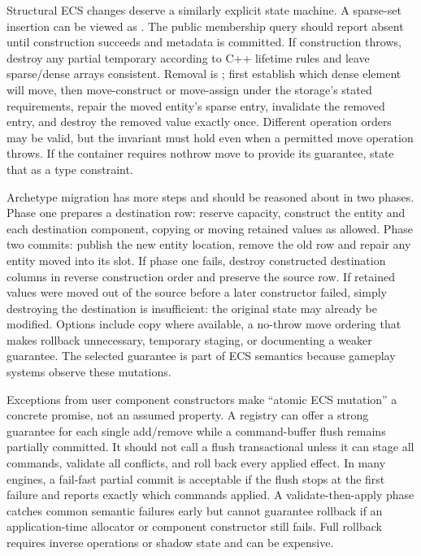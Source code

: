 Structural ECS changes deserve a similarly explicit state machine. A sparse-set insertion can be viewed as . The public membership query should report absent until construction succeeds and metadata is committed. If construction throws, destroy any partial temporary according to C++ lifetime rules and leave sparse/dense arrays consistent. Removal is ; first establish which dense element will move, then move-construct or move-assign under the storage's stated requirements, repair the moved entity's sparse entry, invalidate the removed entry, and destroy the removed value exactly once. Different operation orders may be valid, but the invariant must hold even when a permitted move operation throws. If the container requires nothrow move to provide its guarantee, state that as a type constraint.

Archetype migration has more steps and should be reasoned about in two phases. Phase one prepares a destination row: reserve capacity, construct the entity and each destination component, copying or moving retained values as allowed. Phase two commits: publish the new entity location, remove the old row and repair any entity moved into its slot. If phase one fails, destroy constructed destination columns in reverse construction order and preserve the source row. If retained values were moved out of the source before a later constructor failed, simply destroying the destination is insufficient: the original state may already be modified. Options include copy where available, a no-throw move ordering that makes rollback unnecessary, temporary staging, or documenting a weaker guarantee. The selected guarantee is part of ECS semantics because gameplay systems observe these mutations.

Exceptions from user component constructors make ``atomic ECS mutation'' a concrete promise, not an assumed property. A registry can offer a strong guarantee for each single add/remove while a command-buffer flush remains partially committed. It should not call a flush transactional unless it can stage all commands, validate all conflicts, and roll back every applied effect. In many engines, a fail-fast partial commit is acceptable if the flush stops at the first failure and reports exactly which commands applied. A validate-then-apply phase catches common semantic failures early but cannot guarantee rollback if an application-time allocator or component constructor still fails. Full rollback requires inverse operations or shadow state and can be expensive.

